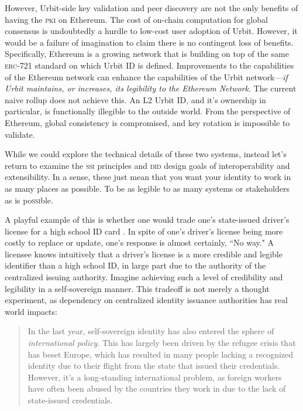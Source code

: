 \documentclass[twoside]{article}
\begin{document}
However, Urbit-side key validation and peer discovery are not the only benefits of having the \textsc{pki} on Ethereum. The cost of on-chain computation for global consensus is undoubtedly a hurdle to low-cost user adoption of Urbit. However, it would be a failure of imagination to claim there is no contingent loss of benefits. Specifically, Ethereum is a growing network that is building on top of the same \textsc{erc}-721 standard on which Urbit ID is defined. Improvements to the capabilities of the Ethereum network can enhance the capabilities of the Urbit network—\emph{if Urbit maintains, or increases, its legibility to the Ethereum Network}.  The current naive rollup does not achieve this. An L2 Urbit ID, and it's ownership in particular, is functionally illegible to the outside world. From the perspective of Ethereum, global consistency is compromised, and key rotation is impossible to validate.

While we could explore the technical details of these two systems, instead let's return to examine the \textsc{ssi} principles and \textsc{did} design goals of interoperability and extensibility. In a sense, these just mean that you want your identity to work in as many places as possible. To be as legible to as many systems or stakeholders as is po\textsc{ssi}ble.

A playful example of this is whether one would trade one's state-issued driver's license for a high school ID card \citep{Sarlev2024}.  In spite of one's driver's license being more costly to replace or update, one's response is almost certainly, ``No way." A licensee knows intuitively that a driver's license is a more credible and legible identifier than a high school ID, in large part due to the authority of the centralized issuing authority. Imagine achieving such a level of credibility and legibility in a self-sovereign manner.  This tradeoff is not merely a thought experiment, as dependency on centralized identity issuance authorities has real world impacts:

\begin{quote}
In the last year, self-sovereign identity has also entered the sphere of \emph{international policy}. This has largely been driven by the refugee crisis that has beset Europe, which has resulted in many people lacking a recognized identity due to their flight from the state that issued their credentials. However, it’s a long-standing international problem, as foreign workers have often been abused by the countries they work in due to the lack of state-issued credentials.  \citep{Allen2016}
\end{quote}
\end{document}
